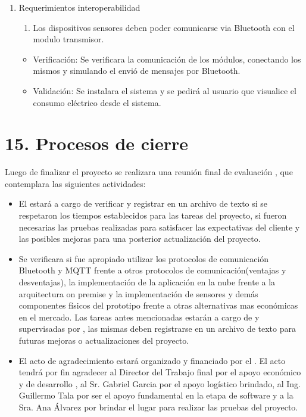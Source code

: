 \documentclass[
11pt, %
]{charter}
\begin{document}
\begin{enumerate}
\begin{enumerate}
		\end{enumerate}
	
	\item Requerimientos interoperabilidad
	\begin{enumerate}
		\item Los dispositivos sensores deben poder comunicarse via Bluetooth con el modulo transmisor.
		
	\end{enumerate}
		\begin{itemize}
			\item Verificación: Se verificara la comunicación de los módulos, conectando los mismos y simulando el envió de mensajes por Bluetooth.
			\item Validación: Se instalara el sistema y se pedirá al usuario que visualice el consumo eléctrico desde el sistema.
			\end{itemize}
	
\end{enumerate}



\section{15. Procesos de cierre}    
\label{sec:cierre}



Luego de finalizar el proyecto se realizara una reunión final de evaluación , que contemplara las siguientes actividades:

\begin{itemize}
	\item El {\authorname}  estará a cargo de verificar y registrar en un archivo de texto si se respetaron los tiempos establecidos para las tareas del proyecto, si fueron necesarias las pruebas realizadas para satisfacer las expectativas del cliente y las posibles mejoras para una posterior actualización del proyecto.
	\item Se verificara si fue apropiado utilizar los protocolos de comunicación Bluetooth y MQTT frente a otros protocolos de comunicación(ventajas y desventajas), la implementación de la aplicación en la nube frente a la arquitectura on premise y la implementación de sensores y demás componentes físicos del prototipo frente a otras alternativas mas económicas en el mercado.
	Las tareas antes mencionadas estarán a cargo de \authorname y supervisadas por \supname, las mismas deben registrarse en un archivo de texto para futuras mejoras o actualizaciones del proyecto.
	\item El acto de agradecimiento estará organizado y financiado por el  \authorname. El acto tendrá por fin agradecer al Director del Trabajo final  \supname por el apoyo económico y de desarrollo , al Sr. Gabriel Garcia por el apoyo logístico brindado, al 
Ing. Guillermo Tala  por ser el apoyo fundamental en la etapa de software y a la  Sra. Ana Álvarez  por brindar el lugar para realizar las pruebas del proyecto.
\end{itemize}	  
	  
\end{document}

